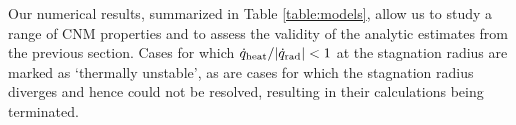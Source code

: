 \documentclass[usenatbib,fleqn]{mn2e}
\newcommand{\Mbh}[1][]{M_{\bullet#1}}
\begin{document}

Our numerical results, summarized in Table \ref{table:models}, allow us to study a range of CNM properties and to assess the validity of the analytic estimates from the previous section.  Cases for which $\dot{q}_{\rm heat}/|\dot{q}_{\rm rad}|< 1$ at the stagnation radius are marked as `thermally unstable', as are cases for which the stagnation radius diverges and hence could not be resolved, resulting in their calculations being terminated.  
\end{document}
